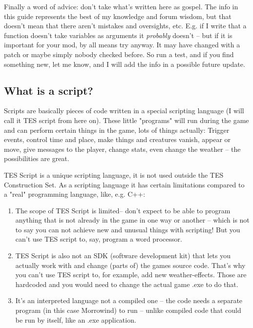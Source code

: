 \documentclass[oneside]{article}
\begin{document}
Finally a word of advice: don't take what's written here as gospel. The info in this guide represents the best of my knowledge and forum wisdom, but that doesn't mean that there aren't mistakes and oversights, etc. E.g. if I write that a function doesn't take variables as arguments it \emph{probably} doesn't -- but if it is important for your mod, by all means try anyway. It may have changed with a patch or maybe simply nobody checked before. So run a test, and if you find something new, let me know, and I will add the info in a possible future update.

\hypertarget{what-is-a-script}{%
\subsection{What is a script?}\label{what-is-a-script}}

Scripts are basically pieces of code written in a special scripting language (I will call it TES script from here on). These little "programs" will run during the game and can perform certain things in the game, lots of things actually: Trigger events, control time and place, make things and creatures vanish, appear or move, give messages to the player, change stats, even change the weather -- the possibilities are great.

TES Script is a unique scripting language, it is not used outside the TES Construction Set. As a scripting language it has certain limitations compared to a "real" programming language, like, e.g. C++:

\begin{enumerate}
\def\labelenumi{\arabic{enumi}.}
\item
  The scope of TES Script is limited-- don't expect to be able to program anything that is not already in the game in one way or another -- which is not to say you can not achieve new and unusual things with scripting! But you can't use TES script to, say, program a word processor.
\item
  TES Script is also not an SDK (software development kit) that lets you actually work with and change (parts of) the games source code. That's why you can't use TES script to, for example, add new weather-effects. Those are hardcoded and you would need to change the actual game .exe to do that.
\item
  It's an interpreted language not a compiled one -- the code needs a separate program (in this case Morrowind) to run -- unlike compiled code that could be run by itself, like an .exe application.
\end{enumerate}
\end{document}
